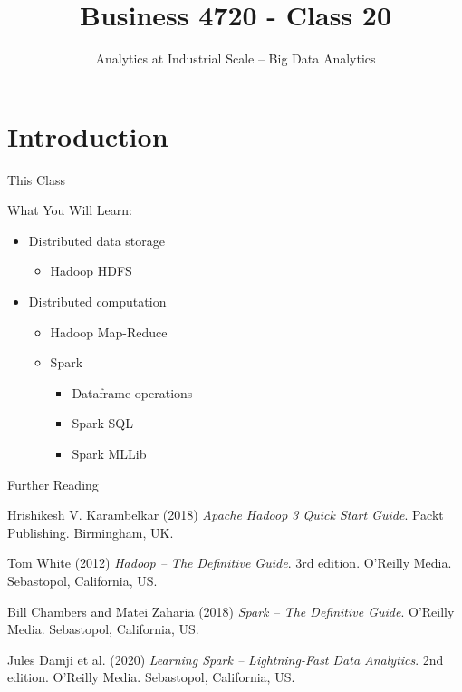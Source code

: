 \documentclass[ignorenonframetext,xcolor=x11names]{beamer}
\title{Business 4720 - Class 20}
\subtitle{Analytics at Industrial Scale -- Big Data Analytics}
\begin{document}
\begin{frame}[label=full]{}
  \titlepage
  \footnotesize
  
\end{frame}

\section{Introduction}

\begin{frame}[label=full]{This Class}

\begin{block}{What You Will Learn:}
\begin{itemize}
  \item Distributed data storage
  \begin{itemize}
     \item Hadoop HDFS
  \end{itemize}
  \item Distributed computation
  \begin{itemize}
     \item Hadoop Map-Reduce
     \item Spark
     \begin{itemize}
        \item Dataframe operations
        \item Spark SQL
        \item Spark MLLib
     \end{itemize}
   \end{itemize}
\end{itemize}
\end{block}
\end{frame}

\begin{frame}[label=full]{Further Reading}
\begin{block}{}
Hrishikesh V. Karambelkar (2018) \emph{Apache Hadoop 3 Quick Start Guide}. Packt Publishing. Birmingham, UK.
\end{block}

\begin{block}{}
Tom White (2012) \emph{Hadoop -- The Definitive Guide}. 3rd edition. O'Reilly Media. Sebastopol, California, US.
\end{block}

\begin{block}{}
Bill Chambers and Matei Zaharia (2018) \emph{Spark -- The Definitive Guide}. O'Reilly Media. Sebastopol, California, US.
\end{block}

\begin{block}{}
Jules Damji et al. (2020) \emph{Learning Spark -- Lightning-Fast Data Analytics}. 2nd edition. O'Reilly Media. Sebastopol, California, US.
\end{block}
\end{frame}
\end{document}
